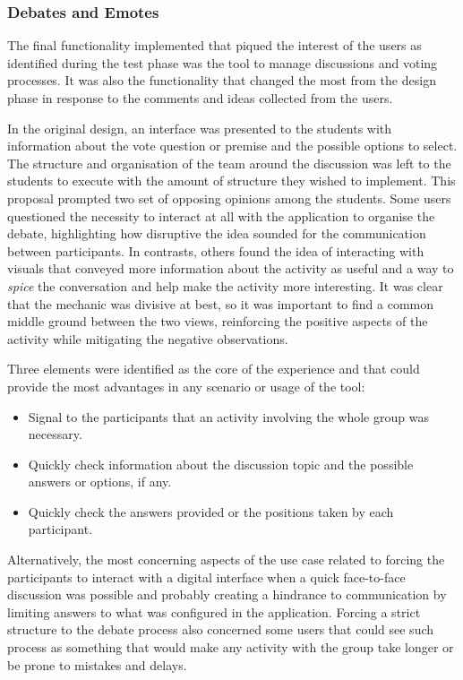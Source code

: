 \subsubsection{Debates and Emotes \label{sec:5-2-3-4}}

The final functionality implemented that piqued the interest of the users as identified during the test phase was the tool to manage discussions and voting processes. It was also the
functionality that changed the most from the design phase in response to the comments and ideas collected from the users.

In the original design, an interface was presented to the students with information about the vote question or premise and the possible options to select. The structure and organisation
of the team around the discussion was left to the students to execute with the amount of structure they wished to implement. This proposal prompted two set of opposing opinions among the
students. Some users questioned the necessity to interact at all with the application to organise the debate, highlighting how disruptive the idea sounded for the communication between
participants. In contrasts, others found the idea of interacting with visuals that conveyed more information about the activity as useful and a way to \emph{spice} the conversation and
help make the activity more interesting. It was clear that the mechanic was divisive at best, so it was important to find a common middle ground between the two views, reinforcing the
positive aspects of the activity while mitigating the negative observations.

Three elements were identified as the core of the experience and that could provide the most advantages in any scenario or usage of the tool:

\begin{itemize}
    \item Signal to the participants that an activity involving the whole group was necessary.
    \item Quickly check information about the discussion topic and the possible answers or options, if any.
    \item Quickly check the answers provided or the positions taken by each participant.
\end{itemize}

Alternatively, the most concerning aspects of the use case related to forcing the participants to interact with a digital interface when a quick face-to-face discussion was possible and
probably creating a hindrance to communication by limiting answers to what was configured in the application. Forcing a strict structure to the debate process also concerned some users
that could see such process as something that would make any activity with the group take longer or be prone to mistakes and delays.

